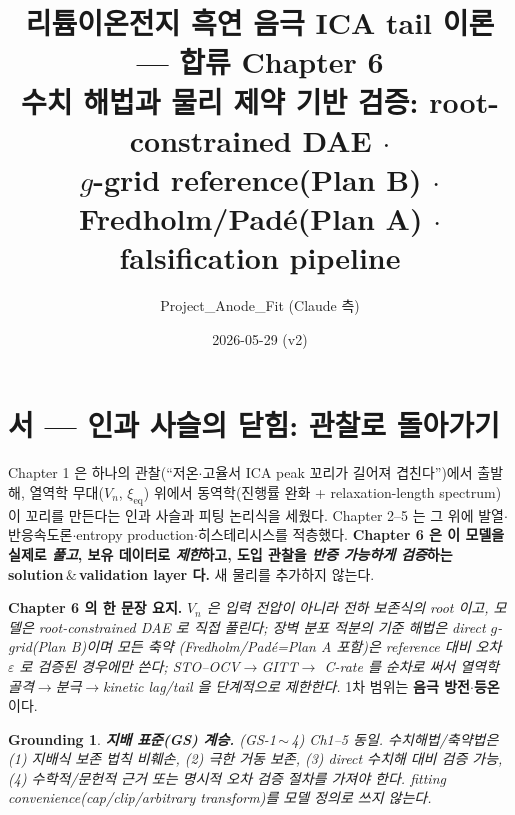 \documentclass[11pt,a4paper]{article}
\title{\textbf{리튬이온전지 흑연 음극 ICA tail 이론 — 합류 Chapter 6}\\[0.4em]
\large 수치 해법과 물리 제약 기반 검증: root-constrained DAE $\cdot$\\
$g$-grid reference(Plan B) $\cdot$ Fredholm/Padé(Plan A) $\cdot$ falsification pipeline}
\author{Project\_Anode\_Fit (Claude 측)}
\date{2026-05-29 (v2)}
\newtheorem*{groundingbox}{Grounding}
\newcommand{\eq}{\mathrm{eq}}
\begin{document}
\maketitle

\section*{서 — 인과 사슬의 닫힘: 관찰로 돌아가기}
Chapter 1 은 하나의 관찰(``저온$\cdot$고율서 ICA peak 꼬리가 길어져 겹친다'')에서 출발해, 열역학 무대($V_n$,
$\xi_{\eq}$) 위에서 동역학(진행률 완화 + relaxation-length spectrum)이 꼬리를 만든다는 인과 사슬과 피팅
논리식을 세웠다. Chapter 2--5 는 그 위에 발열$\cdot$반응속도론$\cdot$entropy production$\cdot$히스테리시스를
적층했다. \textbf{Chapter 6 은 이 모델을 실제로 \emph{풀고}, 보유 데이터로 \emph{제한}하고, 도입 관찰을
\emph{반증 가능하게 검증}하는 solution\,$\&$\,validation layer 다.} 새 물리를 추가하지 않는다.

\textbf{Chapter 6 의 한 문장 요지.} \emph{$V_n$ 은 입력 전압이 아니라 전하 보존식의 root 이고, 모델은
root-constrained DAE 로 직접 풀린다; 장벽 분포 적분의 기준 해법은 direct $g$-grid(Plan B)이며 모든 축약
(Fredholm/Padé=Plan A 포함)은 reference 대비 오차 $\varepsilon$ 로 검증된 경우에만 쓴다; STO--OCV$\to$GITT$\to$
C-rate 를 순차로 써서 열역학 골격$\to$분극$\to$kinetic lag/tail 을 단계적으로 제한한다.} 1차 범위는
\textbf{음극 방전$\cdot$등온}이다.

\begin{groundingbox}
\textbf{지배 표준(GS) 계승.} (GS-1\,$\sim$\,4) Ch1--5 동일. 수치해법/축약법은 (1) 지배식 보존 법칙 비훼손,
(2) 극한 거동 보존, (3) direct 수치해 대비 검증 가능, (4) 수학적/문헌적 근거 또는 명시적 오차 검증 절차를
가져야 한다. fitting convenience(cap/clip/arbitrary transform)를 모델 정의로 쓰지 않는다.
\end{groundingbox}

\tableofcontents
\newpage

\end{document}
